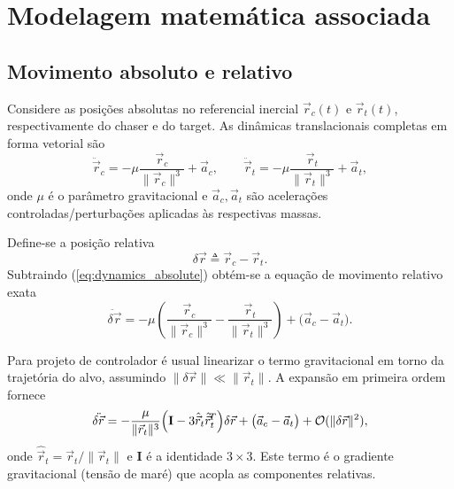 



\section{Modelagem matemática associada}
\subsection{Movimento absoluto e relativo}
\label{sec:movimento_absoluto_relativo}

Considere as posições absolutas no referencial inercial $\vec{r}_c(t)$ e $\vec{r}_t(t)$, respectivamente do chaser e do target. As dinâmicas translacionais completas em forma vetorial são
\begin{equation}
\ddot{\vec{r}}_c = -\mu\frac{\vec{r}_c}{\|\vec{r}_c\|^3} + \vec{a}_c,
\qquad
\ddot{\vec{r}}_t = -\mu\frac{\vec{r}_t}{\|\vec{r}_t\|^3} + \vec{a}_t,
\label{eq:dynamics_absolute}
\end{equation}
onde $\mu$ é o parâmetro gravitacional e $\vec{a}_c,\vec{a}_t$ são acelerações controladas/perturbações aplicadas às respectivas massas.

Define-se a posição relativa
\begin{equation}
\delta\vec{r} \triangleq \vec{r}_c - \vec{r}_t.
\end{equation}
Subtraindo (\ref{eq:dynamics_absolute}) obtém-se a equação de movimento relativo exata
\begin{equation}
\ddot{\delta\vec{r}} = -\mu\!\left(\frac{\vec{r}_c}{\|\vec{r}_c\|^3}-\frac{\vec{r}_t}{\|\vec{r}_t\|^3}\right) + \bigl(\vec{a}_c-\vec{a}_t\bigr).
\label{eq:relative_exact}
\end{equation}

Para projeto de controlador é usual linearizar o termo gravitacional em torno da trajetória do alvo, assumindo $\|\delta\vec{r}\|\ll\|\vec{r}_t\|$. A expansão em primeira ordem fornece
\begin{equation}
\ddot{\delta\vec{r}} = -\frac{\mu}{\|\vec{r}_t\|^3}\Bigl(\mathbf{I}-3\hat{\vec{r}}_t\hat{\vec{r}}_t^{\!T}\Bigr)\delta\vec{r} + \bigl(\vec{a}_c-\vec{a}_t\bigr) + \mathcal{O}(\|\delta\vec{r}\|^2),
\label{eq:relative_linearized}
\end{equation}
onde $\hat{\vec{r}}_t=\vec{r}_t/\|\vec{r}_t\|$ e $\mathbf{I}$ é a identidade $3\times3$. Este termo é o gradiente gravitacional (tensão de maré) que acopla as componentes relativas.

